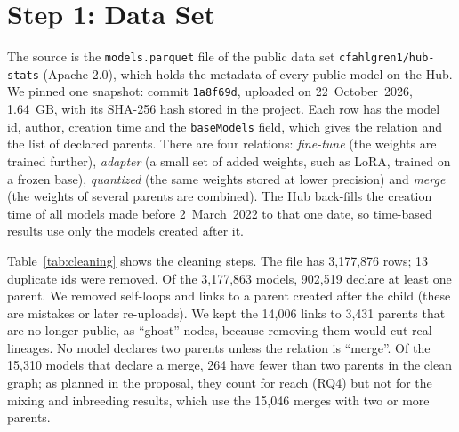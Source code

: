 \documentclass[conference]{IEEEtran}
\begin{document}
\section{Step 1: Data Set}

The source is the \texttt{models.parquet} file of the public data set
\texttt{cfahlgren1/hub-stats} (Apache-2.0), which holds the metadata of every
public model on the Hub. We pinned one snapshot: commit
\texttt{1a8f69d}, uploaded on 22~October~2026, 1.64~GB, with its SHA-256 hash
stored in the project. Each row has the model id, author, creation time and
the \texttt{baseModels} field, which gives the relation and the list of
declared parents. There are four relations: \emph{fine-tune} (the weights are
trained further), \emph{adapter} (a small set of added weights, such as LoRA,
trained on a frozen base), \emph{quantized} (the same weights stored at lower
precision) and \emph{merge} (the weights of several parents are combined).
The Hub back-fills the creation time of all models made before 2~March~2022 to
that one date, so time-based results use only the models created after it.

Table~\ref{tab:cleaning} shows the cleaning steps. The file has 3,177,876 rows;
13 duplicate ids were removed. Of the 3,177,863 models, 902,519 declare at least
one parent. We removed self-loops and links to a parent created after the
child (these are mistakes or later re-uploads). We kept the 14,006 links to
3,431 parents that are no longer public, as ``ghost'' nodes, because removing
them would cut real lineages. No model declares two parents unless the relation
is ``merge''. Of the 15,310 models that declare a merge, 264 have fewer than two
parents in the clean graph; as planned in the proposal, they count for reach (RQ4)
but not for the mixing and inbreeding results, which use the 15,046 merges with
two or more parents.
\end{document}
